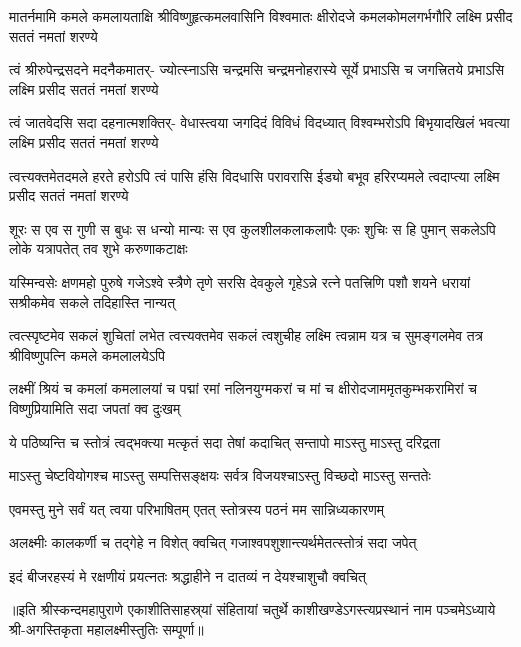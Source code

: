 


\fourlineindentedshloka
{मातर्नमामि कमले कमलायताक्षि}
{श्रीविष्णुहृत्कमलवासिनि विश्वमातः}
{क्षीरोदजे कमलकोमलगर्भगौरि}
{लक्ष्मि प्रसीद सततं नमतां शरण्ये}%

\fourlineindentedshloka
{त्वं श्रीरुपेन्द्रसदने मदनैकमातर्-}
{ज्योत्स्नाऽसि चन्द्रमसि चन्द्रमनोहरास्ये}
{सूर्ये प्रभाऽसि च जगत्त्रितये प्रभाऽसि}
{लक्ष्मि प्रसीद सततं नमतां शरण्ये}%


\fourlineindentedshloka
{त्वं जातवेदसि सदा दहनात्मशक्तिर्-}
{वेधास्त्वया जगदिदं विविधं विदध्यात्}
{विश्वम्भरोऽपि बिभृयादखिलं भवत्या}
{लक्ष्मि प्रसीद सततं नमतां शरण्ये}%

\fourlineindentedshloka
{त्वत्त्यक्तमेतदमले हरते हरोऽपि}
{त्वं पासि हंसि विदधासि परावरासि}
{ईड्यो बभूव हरिरप्यमले त्वदाप्त्या}
{लक्ष्मि प्रसीद सततं नमतां शरण्ये}%

\fourlineindentedshloka
{शूरः स एव स गुणी स बुधः स धन्यो}
{मान्यः स एव कुलशीलकलाकलापैः}
{एकः शुचिः स हि पुमान् सकलेऽपि लोके}
{यत्रापतेत् तव शुभे करुणाकटाक्षः}%

\fourlineindentedshloka
{यस्मिन्वसेः क्षणमहो पुरुषे गजेऽश्वे}
{स्त्रैणे तृणे सरसि देवकुले गृहेऽन्ने}
{रत्ने पतत्त्रिणि पशौ शयने धरायां}
{सश्रीकमेव सकले तदिहास्ति नान्यत्}%

\fourlineindentedshloka
{त्वत्स्पृष्टमेव सकलं शुचितां लभेत}
{त्वत्त्यक्तमेव सकलं त्वशुचीह लक्ष्मि}
{त्वन्नाम यत्र च सुमङ्गलमेव तत्र}
{श्रीविष्णुपत्नि कमले कमलालयेऽपि}%

\fourlineindentedshloka
{लक्ष्मीं श्रियं च कमलां कमलालयां च}
{पद्मां रमां नलिनयुग्मकरां च मां च}
{क्षीरोदजाममृतकुम्भकरामिरां च}
{विष्णुप्रियामिति सदा जपतां क्व दुःखम्}%

\twolineshloka
{ये पठिष्यन्ति च स्तोत्रं त्वद्भक्त्या मत्कृतं सदा}
{तेषां कदाचित् सन्तापो माऽस्तु माऽस्तु दरिद्रता}%

\twolineshloka
{माऽस्तु चेष्टवियोगश्च माऽस्तु सम्पत्तिसङ्क्षयः}
{सर्वत्र विजयश्चाऽस्तु विच्छदो माऽस्तु सन्ततेः}%


\twolineshloka
{एवमस्तु मुने सर्वं यत् त्वया परिभाषितम्}
{एतत् स्तोत्रस्य पठनं मम सान्निध्यकारणम्}%

\twolineshloka
{अलक्ष्मीः कालकर्णी च तद्गेहे न विशेत् क्वचित्}
{गजाश्वपशुशान्त्यर्थमेतत्स्तोत्रं सदा जपेत्}%

\twolineshloka
{इदं बीजरहस्यं मे रक्षणीयं प्रयत्नतः}
{श्रद्धाहीने न दातव्यं न देयश्चाशुचौ क्वचित्}%

॥इति श्रीस्कन्दमहापुराणे एकाशीतिसाहस्र्यां संहितायां चतुर्थे काशीखण्डेऽगस्त्यप्रस्थानं नाम पञ्चमेऽध्याये श्री-अगस्तिकृता महालक्ष्मीस्तुतिः सम्पूर्णा॥

